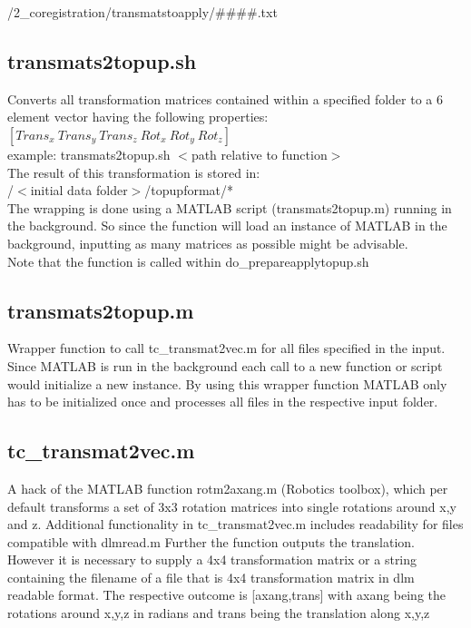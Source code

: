 \documentclass[12pt,a4paper]{scrartcl}
\begin{document}
/2\_coregistration/transmatstoapply/\#\#\#\#.txt

\subsection{transmats2topup.sh}
Converts all transformation matrices contained within a specified folder to a 6 element vector having the following properties:\\

\noindent $[Trans_x~Trans_y~Trans_z~Rot_x~Rot_y~Rot_z]$\\

\noindent example: transmats2topup.sh $<$path relative to function$>$\\

\noindent The result of this transformation is stored in:\\

/$<$initial data folder$>$/topupformat/* \\

\noindent The wrapping is done using a MATLAB script (transmats2topup.m) running in the background. So since the function will load an instance of MATLAB in the background, inputting as many matrices as possible might be advisable.\\

\noindent Note that the function is called within do\_prepareapplytopup.sh

\subsection{transmats2topup.m}
Wrapper function to call tc\_transmat2vec.m for all files specified in the input. Since MATLAB is run in the background each call to a new function or script would initialize a new instance. By using this wrapper function MATLAB only has to be initialized once and processes all files in the respective input folder.

\subsection{tc\_transmat2vec.m}
A hack of the MATLAB function rotm2axang.m (Robotics toolbox), which per default transforms a set of 3x3 rotation matrices into single rotations around x,y and z. Additional functionality in tc\_transmat2vec.m includes readability for files compatible with dlmread.m Further the function outputs the translation. However it is necessary to supply a 4x4 transformation matrix or a string containing the filename of a file that is 4x4 transformation matrix in dlm readable format. The respective outcome is [axang,trans] with axang being the rotations around x,y,z in radians and trans being the translation along x,y,z
\end{document}
